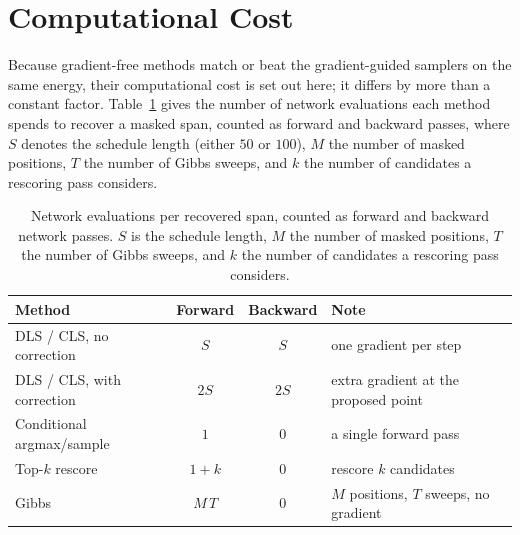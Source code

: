 \clearpage
\section{Computational Cost}
\label{app:cost}

Because gradient-free methods match or beat the gradient-guided samplers on the same energy, their computational cost is set out here; it differs by more than a constant factor. Table~\ref{tab:cost} gives the number of network evaluations each method spends to recover a masked span, counted as forward and backward passes, where $S$ denotes the schedule length (either $50$ or $100$), $M$ the number of masked positions, $T$ the number of Gibbs sweeps, and $k$ the number of candidates a rescoring pass considers.

\begin{table}[h]
    \centering
    \small
    \setlength{\tabcolsep}{4pt}
    \begin{tabular}{lccp{3.9cm}}
        \toprule
        Method & Forward & Backward & Note \\
        \midrule
        DLS / CLS, no correction  & $S$    & $S$  & one gradient per step \\
        DLS / CLS, with correction & $2S$   & $2S$ & extra gradient at the proposed point \\
        Conditional argmax/sample  & $1$    & $0$  & a single forward pass \\
        Top-$k$ rescore            & $1+k$  & $0$  & rescore $k$ candidates \\
        Gibbs                      & $M\,T$ & $0$  & $M$ positions, $T$ sweeps, no gradient \\
        \bottomrule
    \end{tabular}
    \caption[Network evaluations per recovered span.]{Network evaluations per recovered span, counted as forward and backward network passes. $S$ is the schedule length, $M$ the number of masked positions, $T$ the number of Gibbs sweeps, and $k$ the number of candidates a rescoring pass considers.}
    \label{tab:cost}
\end{table}

